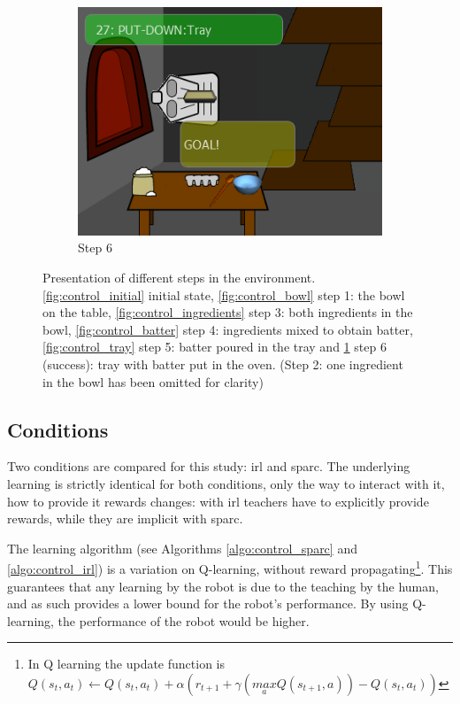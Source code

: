 \begin{figure}[ht]
\begin{subfigure}[b]{0.3\textwidth}
		\includegraphics[width=\textwidth]{step6.png}
		\caption{Step 6}
		\label{fig:control_goal}
	\end{subfigure}
	
	\caption{Presentation of different steps in the environment. \ref{fig:control_initial} initial state, \ref{fig:control_bowl} step 1: the bowl on the table, \ref{fig:control_ingredients} step 3: both ingredients in the bowl, \ref{fig:control_batter} step 4: ingredients mixed to obtain batter, \ref{fig:control_tray} step 5: batter poured in the tray and \ref{fig:control_goal} step 6 (success): tray with batter put in the oven. (Step 2: one ingredient in the bowl has been omitted for clarity)}
	\label{fig:control_states}
\end{figure}

\subsection{Conditions}

Two conditions are compared for this study: \gls{irl} and \gls{sparc}. The underlying learning is strictly identical for both conditions, only the way to interact with it, how to provide it rewards changes: with \gls{irl} teachers have to explicitly provide rewards, while they are implicit with \gls{sparc}. 

The learning algorithm (see Algorithms \ref{algo:control_sparc} and \ref{algo:control_irl}) is a variation on Q-learning, without reward propagating\footnote{In Q learning the update function is $Q(s_{t},a_{t}) \leftarrow Q(s_{t},a_{t}) + \alpha (r_{t+1}+\gamma (\underset{a}{max} Q(s_{t+1},a))-Q(s_{t},a_{t}))$}. This guarantees that any learning by the robot is due to the teaching by the human, and as such provides a lower bound for the robot's performance. By using Q-learning, the performance of the robot would be higher.

